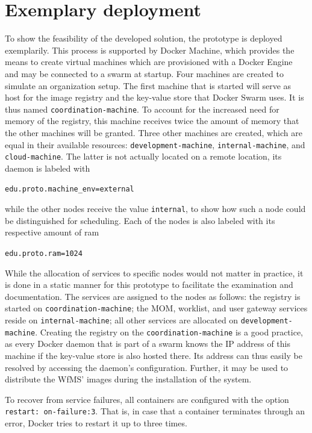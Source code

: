 \section{Exemplary deployment} %
\label{sec:exemplary_deployment}
  To show the feasibility of the developed solution, the prototype is deployed exemplarily. This process is supported by Docker Machine, which provides the means to create virtual machines which are provisioned with a Docker Engine and may be connected to a swarm at startup. Four machines are created to simulate an organization setup. The first machine that is started will serve as host for the image registry and the key-value store that Docker Swarm uses. It is thus named \texttt{coordination-machine}. To account for the increased need for memory of the registry, this machine receives twice the amount of memory that the other machines will be granted. Three other machines are created, which are equal in their available resources: \texttt{development-machine}, \texttt{internal-machine}, and \texttt{cloud-machine}. The latter is not actually located on a remote location, its daemon is labeled with

  \centerline{\texttt{edu.proto.machine\_env=external}}

  while the other nodes receive the value \texttt{internal}, to show how such a node could be distinguished for scheduling. Each of the nodes is also labeled with its respective amount of ram

  \centerline{\texttt{edu.proto.ram=1024}}

  While the allocation of services to specific nodes would not matter in practice, it is done in a static manner for this prototype to facilitate the examination and documentation.
  The services are assigned to the nodes as follows: the registry is started on \texttt{coordination-machine}; the \ac{MOM}, worklist, and user gateway services reside on \texttt{internal-machine}; all other services are allocated on \texttt{development-machine}. Creating the registry on the \texttt{coordination-machine} is a good practice, as every Docker daemon that is part of a swarm knows the \ac{IP} address of this machine if the key-value store is also hosted there. Its address can thus easily be resolved by accessing the daemon's configuration. Further, it may be used to distribute the \ac{WfMS}' images during the installation of the system.

  To recover from service failures, all containers are configured with the option \texttt{restart: on-failure:3}. That is, in case that a container terminates through an error, Docker tries to restart it up to three times.

